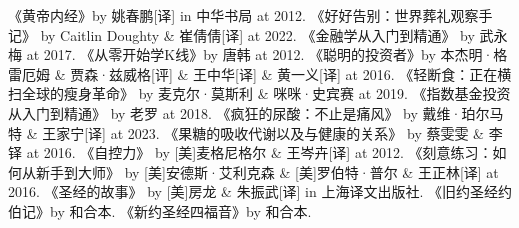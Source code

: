 \documentclass[12pt,oneside]{book}
\begin{document}
\begin{thebibliography}{99}
 《黄帝内经》by 姚春鹏[译] in 中华书局 at 2012.
 《好好告别：世界葬礼观察手记》 by Caitlin Doughty \& 崔倩倩[译] at 2022. 
 《金融学从入门到精通》 by 武永梅 at 2017.
 《从零开始学K线》by 唐韩 at 2012. 
 《聪明的投资者》by 本杰明·格雷厄姆 \& 贾森·兹威格[评] \& 王中华[译] \& 黄一义[译] at 2016.
  《轻断食：正在横扫全球的瘦身革命》 by 麦克尔·莫斯利 \& 咪咪·史宾赛 at 2019.
  《指数基金投资从入门到精通》 by 老罗 at 2018.
  《疯狂的尿酸：不止是痛风》 by 戴维·珀尔马特 \& 王家宁[译] at 2023.
  《果糖的吸收代谢以及与健康的关系》 by 蔡雯雯 \& 李铎 at 2016.
  《自控力》 by [美]麦格尼格尔  \& 王岑卉[译] at 2012.
 《刻意练习：如何从新手到大师》 by [美]安德斯·艾利克森 \& [美]罗伯特·普尔 \& 王正林[译] at 2016.
 《圣经的故事》 by [美]房龙 \& 朱振武[译] in 上海译文出版社.
 《旧约圣经约伯记》by 和合本.
 《新约圣经四福音》by 和合本.
\end{thebibliography}
\end{document}

